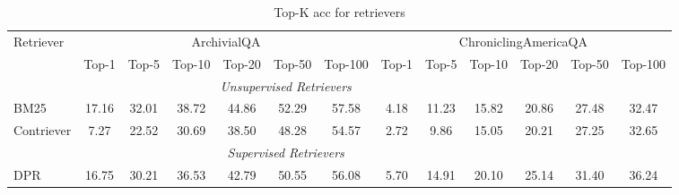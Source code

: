 \begin{table*}[!ht]
\addtolength{\tabcolsep}{-0.65pt}
\small
\centering
\begin{tabular}{@{}l | c c c c c c | c c c c c c@{}}\toprule
Retriever & \multicolumn{6}{c}{ArchivialQA} & \multicolumn{6}{c}{ChroniclingAmericaQA}  \\

& Top-1 & Top-5 &Top-10 & Top-20 &Top-50 & Top-100 & Top-1 & Top-5 &Top-10 & Top-20 &Top-50 & Top-100  \\
\midrule
\multicolumn{11}{c}{\textit{Unsupervised Retrievers}} \\
\midrule
BM25        &  17.16 &  32.01   &  38.72 & 44.86  & 52.29  &57.58     & 4.18  & 11.23 &  15.82 &  20.86 & 27.48  & 32.47 \\



Contriever &  7.27 & 22.52  &  30.69 & 38.50  & 48.28 & 54.57 & 2.72&   9.86  &  15.05 & 20.21 & 27.25 & 32.65 \\
\midrule
\multicolumn{11}{c}{\textit{Supervised Retrievers}} \\
\midrule
DPR     & 16.75  &  30.21 &  36.53 &  42.79 &  50.55  &  56.08   & 5.70  &  14.91 &  20.10 &25.14 & 31.40& 36.24\\


\midrule
\end{tabular}
\caption{ Top-K acc for retrievers
}
\label{tab:qa3}
\end{table*}


